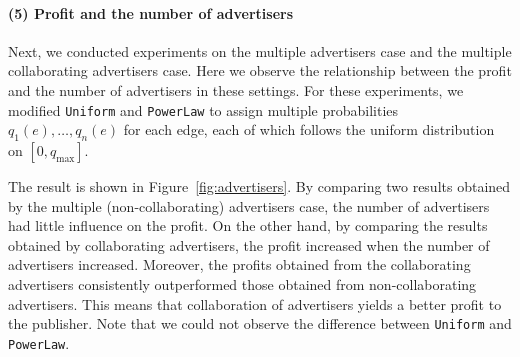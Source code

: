 \documentclass[letterpaper]{article}
\theoremstyle{definition}
\begin{document}
\paragraph{(5) Profit and the number of advertisers}

Next, we conducted experiments on the multiple advertisers case and the multiple collaborating advertisers case.
Here we observe the relationship between the profit and the number of advertisers in these settings.
For these experiments, we modified \texttt{Uniform} and \texttt{PowerLaw}
to assign multiple probabilities $q_1(e), \ldots, q_n(e)$ for each edge, each of which follows the uniform distribution on $[0, q_{\text{max}}]$.

The result is shown in Figure~\ref{fig:advertisers}.
By comparing two results obtained by the multiple (non-collaborating) advertisers case, the number of advertisers had little influence on the profit.
On the other hand, by comparing the results obtained by collaborating advertisers, the profit increased when the number of advertisers increased.
Moreover, the profits obtained from the collaborating advertisers consistently outperformed those obtained from non-collaborating advertisers.
This means that collaboration of advertisers yields a better profit to the publisher.
Note that we could not observe the difference between \texttt{Uniform} and \texttt{PowerLaw}.
\end{document}
